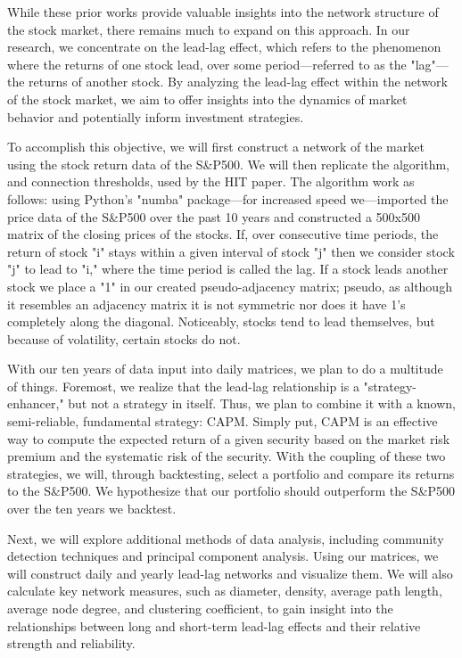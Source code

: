 \documentclass{article}
\begin{document}
While these prior works provide valuable insights into the network structure of the stock market, there remains much to expand on this approach. In our research, we concentrate on the lead-lag effect, which refers to the phenomenon where the returns of one stock lead, over some period—referred to as the "lag"—the returns of another stock. By analyzing the lead-lag effect within the network of the stock market, we aim to offer insights into the dynamics of  market behavior and potentially inform investment strategies.

To accomplish this objective, we will first construct a network of the market using the stock return data of the S\&P500.  We will then replicate the algorithm, and connection thresholds, used by the HIT paper. The algorithm work as follows: using Python's "numba" package—for increased speed we—imported the price data of the S\&P500 over the past 10 years and constructed a 500x500 matrix of the closing prices of the stocks. If, over consecutive time periods, the return of stock "i" stays within a given interval of stock "j" then we consider stock "j" to lead to "i," where the time period is called the lag. If a stock leads another stock we place a "1" in our created pseudo-adjacency matrix; pseudo, as although it resembles an adjacency matrix it is not symmetric nor does it have 1's completely along the diagonal. Noticeably, stocks tend to lead themselves, but because of volatility, certain stocks do not. 

With our ten years of data input into daily matrices, we plan to do a multitude of things.  Foremost, we realize that the lead-lag relationship is a "strategy-enhancer," but not a strategy in itself. Thus, we plan to combine it with a known, semi-reliable, fundamental strategy: CAPM. Simply put, CAPM is an effective way to compute the expected return of a given security based on the market risk premium and the systematic risk of the security. With the coupling of these two strategies, we will, through backtesting, select a portfolio and compare its returns to the S\&P500. We hypothesize that our portfolio should outperform the S\&P500 over the ten years we backtest.

Next, we will explore additional methods of data analysis, including community detection techniques and principal component analysis. Using our matrices, we will construct daily and yearly lead-lag networks and visualize them. We will also calculate key network measures, such as diameter, density, average path length, average node degree, and clustering coefficient, to gain insight into the relationships between long and short-term lead-lag effects and their relative strength and reliability.
\end{document}
